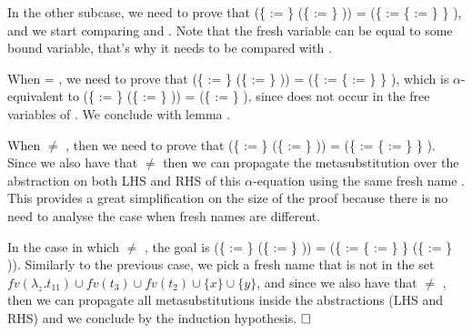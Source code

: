\begin{coqdoccode}
\end{coqdoccode}
In the other subcase, we need to prove that (\{ := \}   (\{ := \}    )) = (\{ := \{ := \} \}   ), and we start comparing  and . Note that the fresh variable  can be equal to some bound variable, that's why it needs to be compared with .
\begin{coqdoccode}
\end{coqdoccode}
When  = , we need to prove that (\{ := \}   (\{ := \} )) = (\{ := \{ := \} \}   ), which is $\alpha$-equivalent to  (\{ := \}   (\{ := \} )) = (\{ := \}   ), since  does not occur in the free variables of . We conclude with lemma .
\begin{coqdoccode}
 \end{coqdoccode}
When  \ensuremath{\not=} , then we need to prove that (\{ := \}   (\{ := \}    )) = (\{ := \{ := \} \}   ). Since we also have that  \ensuremath{\not=}  then we can propagate the metasubstitution over the abstraction on both LHS and RHS of this $\alpha$-equation using the same fresh name . This provides a great simplification on the size of the proof because there is no need to analyse the case when fresh names are different.
\begin{coqdoccode}
\end{coqdoccode}
In the case in which  \ensuremath{\not=} , the goal is (\{ := \} (\{ := \}   )) = (\{ := \{ := \} \} (\{ := \}   )). Similarly to the previous case, we pick a fresh name  that is not in the set $fv(\lambda_z.t_{11}) \cup fv(t_3) \cup fv(t_2) \cup \{x\} \cup \{y\}$, and since we also have that  \ensuremath{\not=} , then we can propagate all metasubstitutions inside the abstractions (LHS and RHS) and we conclude by the induction hypothesis. $\hfill\Box$
